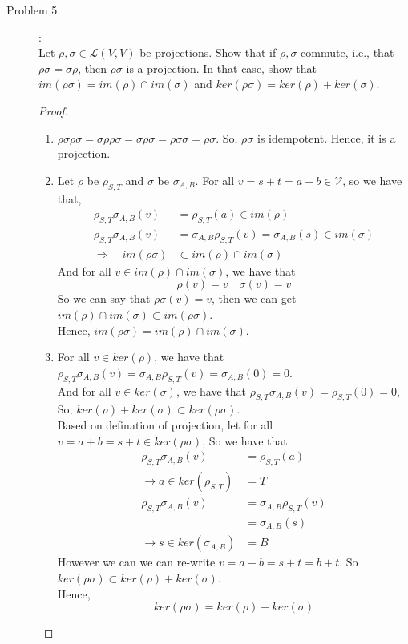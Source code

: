 \documentclass[a4paper]{article}
\begin{document}
\begin{description}
\item[Problem 5]:\\
Let $\rho, \sigma\in\mathcal{L}(V,V)$ be projections. Show that if $\rho, \sigma$ commute, i.e., that $\rho\sigma = \sigma\rho$, then $\rho\sigma$ is a projection. In that case, show that $im(\rho\sigma) = im(\rho)\cap im(\sigma)$ and $ker(\rho\sigma) = ker(\rho) + ker(\sigma)$.


\begin{proof}\
  \begin{enumerate}[ 1) ]
    \item $\rho\sigma\rho\sigma=\sigma\rho\rho\sigma=\sigma\rho\sigma=\rho\sigma\sigma=\rho\sigma$. So, $\rho\sigma$ is idempotent. Hence, it is a projection.
    \item Let $\rho$ be $\rho_{S,T}$ and $\sigma$ be $\sigma_{A,B}$. For all $v=s+t=a+b \in \mathcal{V}$, so we have that,
    \begin{align*}
      \rho_{S,T}\sigma_{A,B}(v)&=\rho_{S,T}(a)\in im(\rho)\\
      \rho_{S,T}\sigma_{A,B}(v)&=\sigma_{A,B}\rho_{S,T}(v)=\sigma_{A,B}(s)\in im(\sigma)\\
      \Rightarrow \quad im(\rho\sigma)&\subset im(\rho)\cap im(\sigma)
    \end{align*}
    And for all $v\in im(\rho)\cap im(\sigma)$, we have that $$\rho(v)=v\quad \sigma(v)=v$$
    So we can say that $\rho\sigma(v)=v$, then we can get $im(\rho)\cap im(\sigma)\subset im(\rho\sigma)$.\\
    Hence, $im(\rho\sigma) = im(\rho)\cap im(\sigma)$.
    \item For all $v \in ker(\rho)$, we have that $\rho_{S,T}\sigma_{A,B}(v)=\sigma_{A,B}\rho_{S,T}(v)=\sigma_{A,B}(0)=0$.\\
    And for all $v \in ker(\sigma)$, we have that $\rho_{S,T}\sigma_{A,B}(v)=\rho_{S,T}(0)=0$, \\
    So, $ker(\rho)+ker(\sigma)\subset ker(\rho\sigma)$.\\
    Based on defination of projection, let for all $v=a+b=s+t \in ker(\rho\sigma)$,
    So we have that
    \begin{align*}
      \rho_{S,T}\sigma_{A,B}(v)&=\rho_{S,T}(a)\\
      \to a \in ker(\rho_{S,T})&=T\\
      \rho_{S,T}\sigma_{A,B}(v)&=\sigma_{A,B}\rho_{S,T}(v)\\
      &=\sigma_{A,B}(s)\\
      \to s \in ker(\sigma_{A,B})&=B
    \end{align*}
    However we can we can re-write $v=a+b=s+t=b+t$. So $ker(\rho\sigma)\subset ker(\rho)+ker(\sigma)$.\\
    Hence, $$ker(\rho\sigma)=ker(\rho)+ker(\sigma)$$
  \end{enumerate}
\end{proof}

\end{description}
\end{document}
